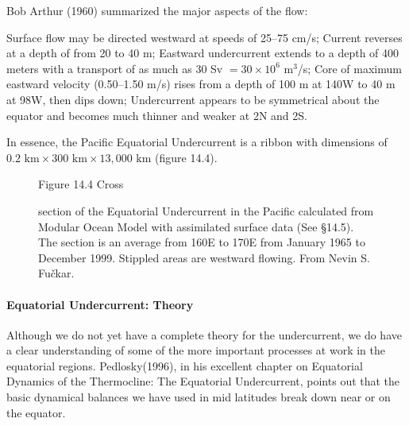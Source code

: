 Bob Arthur (1960) summarized the major aspects of the flow:
\begin{enumerate}
\vitem
Surface flow may be directed westward at speeds of 25--75 cm/s;
\vitem
Current reverses at a depth of from 20 to 40 m;
\vitem
Eastward undercurrent extends to a depth of 400 meters with a
transport of as much as 30 Sv $=30 \times 10^6$
m$^3$/s;
\vitem
Core of maximum eastward velocity (0.50--1.50 m/s) rises
from a depth of 100 m at 140\degrees W to 40 m at 98\degrees W, then dips down;
\vitem
Undercurrent appears to be symmetrical about the equator and
becomes much thinner and weaker at 2\degrees N and 2\degrees S.
\end{enumerate}
In essence, the Pacific Equatorial Undercurrent is a ribbon with dimensions of
$0.2 \text{ km} \times 300 \text{ km} \times 13,000 \text{ km}$ (figure 14.4).

\begin{figure}[t!]
\footnotesize
Figure 14.4 Cross \rule{0pt}{4ex}section of the Equatorial Undercurrent in the
Pacific calculated from Modular Ocean Model with assimilated surface data (See
\S 14.5). The section is an average from 160\degrees E to 170\degrees E from January
1965 to December 1999. Stippled areas are westward flowing. From Nevin S. Fu\v{c}kar.

\label{fig:equatorialxsec}
\vspace{-3ex}
\end{figure}

\paragraph{Equatorial Undercurrent: Theory}
Although we do not yet have a complete theory
for the undercurrent, we do have a clear understanding of some of the more important processes
at work in the equatorial regions. Pedlosky(1996), in his excellent chapter on Equatorial
Dynamics of the Thermocline: The Equatorial Undercurrent, points out that the basic dynamical
balances we have used in mid latitudes break down near or on the equator.

